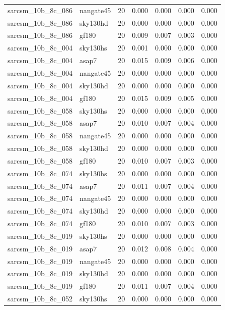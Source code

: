 \begin{tabular}{llrrrrr}
sarcsm\_10b\_8c\_086 & nangate45 & 20 & 0.000 & 0.000 & 0.000 & 0.000 \\
sarcsm\_10b\_8c\_086 & sky130hd & 20 & 0.000 & 0.000 & 0.000 & 0.000 \\
sarcsm\_10b\_8c\_086 & gf180 & 20 & 0.009 & 0.007 & 0.003 & 0.000 \\
sarcsm\_10b\_8c\_004 & sky130hs & 20 & 0.001 & 0.000 & 0.000 & 0.000 \\
sarcsm\_10b\_8c\_004 & asap7 & 20 & 0.015 & 0.009 & 0.006 & 0.000 \\
sarcsm\_10b\_8c\_004 & nangate45 & 20 & 0.000 & 0.000 & 0.000 & 0.000 \\
sarcsm\_10b\_8c\_004 & sky130hd & 20 & 0.000 & 0.000 & 0.000 & 0.000 \\
sarcsm\_10b\_8c\_004 & gf180 & 20 & 0.015 & 0.009 & 0.005 & 0.000 \\
sarcsm\_10b\_8c\_058 & sky130hs & 20 & 0.000 & 0.000 & 0.000 & 0.000 \\
sarcsm\_10b\_8c\_058 & asap7 & 20 & 0.010 & 0.007 & 0.004 & 0.000 \\
sarcsm\_10b\_8c\_058 & nangate45 & 20 & 0.000 & 0.000 & 0.000 & 0.000 \\
sarcsm\_10b\_8c\_058 & sky130hd & 20 & 0.000 & 0.000 & 0.000 & 0.000 \\
sarcsm\_10b\_8c\_058 & gf180 & 20 & 0.010 & 0.007 & 0.003 & 0.000 \\
sarcsm\_10b\_8c\_074 & sky130hs & 20 & 0.000 & 0.000 & 0.000 & 0.000 \\
sarcsm\_10b\_8c\_074 & asap7 & 20 & 0.011 & 0.007 & 0.004 & 0.000 \\
sarcsm\_10b\_8c\_074 & nangate45 & 20 & 0.000 & 0.000 & 0.000 & 0.000 \\
sarcsm\_10b\_8c\_074 & sky130hd & 20 & 0.000 & 0.000 & 0.000 & 0.000 \\
sarcsm\_10b\_8c\_074 & gf180 & 20 & 0.010 & 0.007 & 0.003 & 0.000 \\
sarcsm\_10b\_8c\_019 & sky130hs & 20 & 0.000 & 0.000 & 0.000 & 0.000 \\
sarcsm\_10b\_8c\_019 & asap7 & 20 & 0.012 & 0.008 & 0.004 & 0.000 \\
sarcsm\_10b\_8c\_019 & nangate45 & 20 & 0.000 & 0.000 & 0.000 & 0.000 \\
sarcsm\_10b\_8c\_019 & sky130hd & 20 & 0.000 & 0.000 & 0.000 & 0.000 \\
sarcsm\_10b\_8c\_019 & gf180 & 20 & 0.011 & 0.007 & 0.004 & 0.000 \\
sarcsm\_10b\_8c\_052 & sky130hs & 20 & 0.000 & 0.000 & 0.000 & 0.000 \\

\end{tabular}
